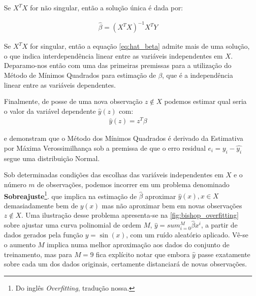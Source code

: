 Se $ X^TX  $ for não singular, então a solução única é dada por:

\begin{align}\label{eq:hat_beta}
\hat{\beta} = (X^TX)^{-1}X^TY
\end{align} 

Se $ X^TX $ for singular, então a equação \ref{eq:hat_beta} admite mais de uma solução, o que indica interdependência linear entre as variáveis independentes em $ X $. Deparamo-nos então com uma das primeiras premissas para a utilização do Método de Mínimos Quadrados para estimação de $ \beta $, que é a independência linear entre as variáveis dependentes.


Finalmente, de posse de uma nova observação $ z \notin X $ podemos estimar qual seria o valor da variável dependente $ \hat{y}(z) $ com:
\begin{align}
\hat{y}(z) = z^T\beta
\end{align}


%
%
%



\cite[p.140-143]{Bishop} e \cite[p.178-180]{Andersen} demonstram que o Método dos Mínimos Quadrados é derivado da Estimativa por Máxima Verossimilhança sob a premissa de que o erro residual $ e_i = y_i - \hat{y_i} $ segue uma distribuição Normal.

Sob determinadas condições das escolhas das variáveis independentes em $ X $ e o número $ m $  de observações, podemos incorrer em um problema denominado \textbf{Sobreajuste}\footnote{Do inglês \textit{Overfitting}, tradução nossa.}\cite[p.]{Bishop}. que implica na estimação de $ \hat{\beta} $ aproximar $ \hat{y}(x), x \in X  $ demasiadamente bem de $ y(x) $ mas não aproximar bem em novas observações $ z \notin X $. Uma ilustração desse problema apresenta-se na \cref{fig:bishop_overfitting} sobre ajustar uma curva polinomial de ordem $ M $, $ \hat{y} = sum_{i=0}^M \hat{\beta}x^i$, a partir de dados gerados pela função $ y = \sin(x) $, com um ruído aleatório aplicado. Vê-se o aumento $ M $ implica numa melhor aproximação aos dados do conjunto de treinamento, mas para $ M=9 $ fica explícito notar que embora $ \hat{y} $ passe exatamente sobre cada um dos dados originais, certamente distanciará de novas observações. 

